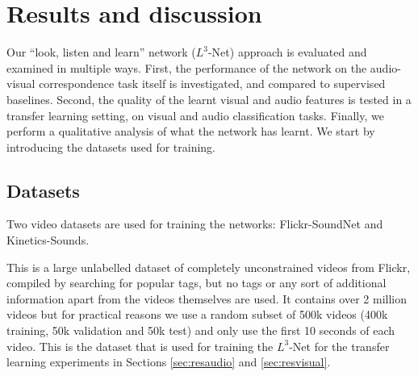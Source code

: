 \documentclass[10pt,twocolumn,letterpaper]{article}
\renewcommand{\paragraph}[1]{\smallskip\noindent{\bf{#1}}}
\begin{document}
\section{Results and discussion}
\label{sec:results}

Our ``look, listen and learn'' network ($L^3$-Net) approach is evaluated and examined
in multiple ways.
First, the performance of the network on the audio-visual correspondence
task itself is investigated, and compared to supervised baselines.
Second, the quality of the learnt visual and audio features is tested
in a transfer learning setting, on visual and audio classification tasks.
Finally, we perform a qualitative analysis of what the network has learnt.
We start by introducing the datasets used for training.


\subsection{Datasets}
\label{sec:datasets}

Two video datasets are used for training the networks:
Flickr-SoundNet and Kinetics-Sounds.

\paragraph{Flickr-SoundNet \cite{Aytar16}.}
This is a large unlabelled dataset of completely unconstrained videos
from Flickr, compiled by searching for popular tags, but no tags
or any sort of additional information apart from the videos themselves
are used.
It contains over 2 million videos but for practical reasons we
use a random subset of 500k videos
(400k training, 50k validation and 50k test)
and only use the first 10 seconds of each video.
This is the dataset that is used for training the $L^3$-Net
for the transfer learning experiments in
Sections \ref{sec:resaudio} and \ref{sec:resvisual}. 
\end{document}
